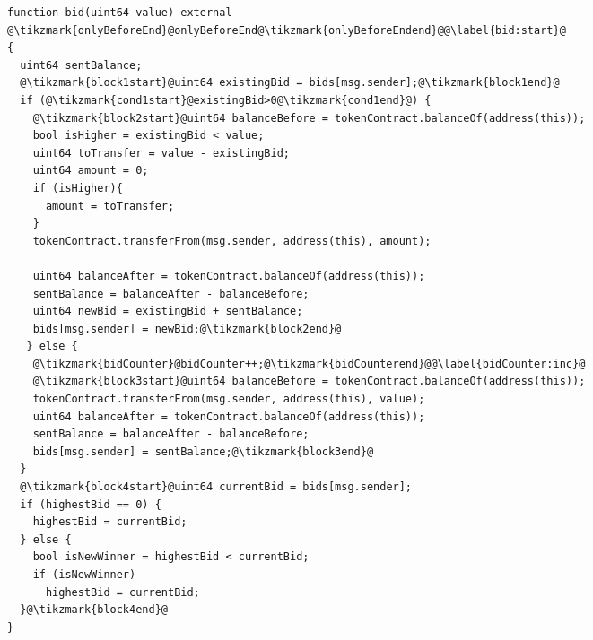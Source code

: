 \begin{figure*}[t]
    \begin{multicols}{2} %
        \begin{lstlisting}[basicstyle=\scriptsize,  numberstyle=\scriptsize, language=Solidity, caption={Original function code \textit{bid} of BlindAuction.}, label=lst:bid]
function bid(uint64 value) external @\tikzmark{onlyBeforeEnd}@onlyBeforeEnd@\tikzmark{onlyBeforeEndend}@@\label{bid:start}@ 
{
  uint64 sentBalance;
  @\tikzmark{block1start}@uint64 existingBid = bids[msg.sender];@\tikzmark{block1end}@
  if (@\tikzmark{cond1start}@existingBid>0@\tikzmark{cond1end}@) {
    @\tikzmark{block2start}@uint64 balanceBefore = tokenContract.balanceOf(address(this));
    bool isHigher = existingBid < value;
    uint64 toTransfer = value - existingBid;
    uint64 amount = 0;
    if (isHigher){
      amount = toTransfer;
    }
    tokenContract.transferFrom(msg.sender, address(this), amount);
    
    uint64 balanceAfter = tokenContract.balanceOf(address(this));
    sentBalance = balanceAfter - balanceBefore;
    uint64 newBid = existingBid + sentBalance;
    bids[msg.sender] = newBid;@\tikzmark{block2end}@
   } else {
    @\tikzmark{bidCounter}@bidCounter++;@\tikzmark{bidCounterend}@@\label{bidCounter:inc}@
    @\tikzmark{block3start}@uint64 balanceBefore = tokenContract.balanceOf(address(this));
    tokenContract.transferFrom(msg.sender, address(this), value);
    uint64 balanceAfter = tokenContract.balanceOf(address(this));
    sentBalance = balanceAfter - balanceBefore;
    bids[msg.sender] = sentBalance;@\tikzmark{block3end}@
  }
  @\tikzmark{block4start}@uint64 currentBid = bids[msg.sender];
  if (highestBid == 0) {
    highestBid = currentBid;
  } else {
    bool isNewWinner = highestBid < currentBid;
    if (isNewWinner)
      highestBid = currentBid;
  }@\tikzmark{block4end}@
}
    

\end{lstlisting}
\end{multicols}
\end{figure*}
